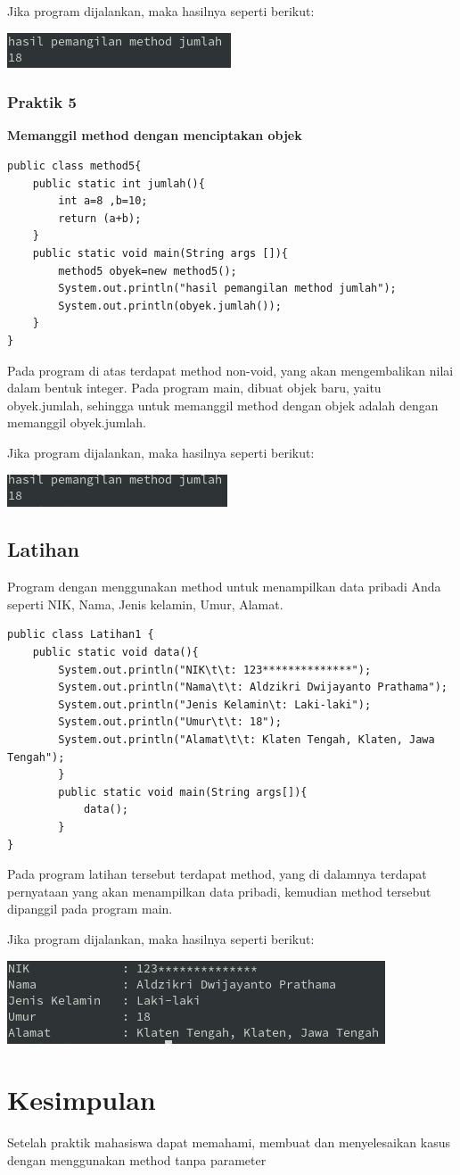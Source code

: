 \documentclass[a4paper,12pt]{article}
\begin{document}
Jika program dijalankan, maka hasilnya seperti berikut:
\begin{center}
    \includegraphics{4.png} 
\end{center}

\subsubsection{Praktik 5}
\textbf{Memanggil method dengan menciptakan objek}
\begin{lstlisting}
public class method5{
	public static int jumlah(){
		int a=8 ,b=10;
		return (a+b);
	}
	public static void main(String args []){
		method5 obyek=new method5();
		System.out.println("hasil pemangilan method jumlah");
		System.out.println(obyek.jumlah());
	}
}
\end{lstlisting}
Pada program di atas terdapat method non-void, yang akan mengembalikan nilai dalam bentuk integer. Pada program main,
dibuat objek baru, yaitu obyek.jumlah, sehingga untuk memanggil method dengan objek adalah dengan memanggil
obyek.jumlah.

Jika program dijalankan, maka hasilnya seperti berikut:
\begin{center}
    \includegraphics{5.png} 
\end{center}

\newpage

\subsection{Latihan}
Program dengan menggunakan method untuk menampilkan data pribadi Anda seperti NIK, Nama, Jenis kelamin, Umur, Alamat.
\begin{lstlisting}
public class Latihan1 {
	public static void data(){
		System.out.println("NIK\t\t: 123**************");
		System.out.println("Nama\t\t: Aldzikri Dwijayanto Prathama");
		System.out.println("Jenis Kelamin\t: Laki-laki");
		System.out.println("Umur\t\t: 18");
		System.out.println("Alamat\t\t: Klaten Tengah, Klaten, Jawa Tengah");
		}
		public static void main(String args[]){
			data();
		}
}
\end{lstlisting}
Pada program latihan tersebut terdapat method, yang di dalamnya terdapat pernyataan yang akan menampilkan data pribadi,
kemudian method tersebut dipanggil pada program main.

Jika program dijalankan, maka hasilnya seperti berikut:
\begin{center}
    \includegraphics{6.png} 
\end{center}

\newpage

\section{Kesimpulan}
Setelah praktik mahasiswa dapat memahami, membuat dan menyelesaikan kasus dengan
menggunakan method tanpa parameter
\end{document}
